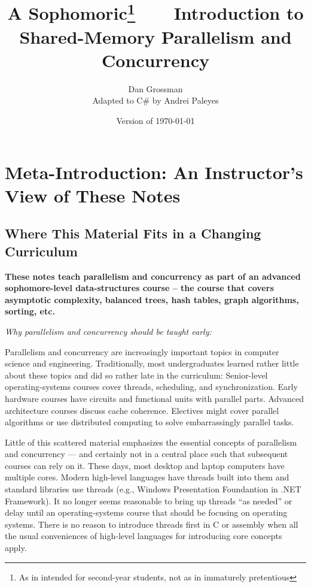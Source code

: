 \documentclass[10pt]{article}
\title{A Sophomoric\footnote{As in intended for second-year students,
    not as in immaturely pretentious}\ \ \ \ Introduction to\\ Shared-Memory
    Parallelism and Concurrency}
\author{Dan Grossman\\
Adapted to C\# by Andrei Paleyes}
\date{Version of \today}
\begin{document}
\maketitle

\newpage

\setcounter{tocdepth}{2}
\tableofcontents

\section{Meta-Introduction: An Instructor's View of These Notes}
\label{sec:meta-intro}

\subsection{Where This Material Fits in a Changing Curriculum}

\medskip
\noindent \textbf{These notes teach parallelism and concurrency as part of an
  advanced sophomore-level data-structures course -- the course that
  covers asymptotic complexity, balanced trees, hash tables, graph
  algorithms, sorting, etc.}
\medskip

\medskip
\noindent \emph{Why parallelism and concurrency should be taught early:}
\medskip

Parallelism and concurrency are increasingly important topics in
computer science and engineering.  Traditionally, most undergraduates
learned rather little about these topics and did so rather late in the
curriculum: Senior-level operating-systems courses cover threads,
scheduling, and synchronization.  Early hardware courses have circuits
and functional units with parallel parts.  Advanced architecture
courses discuss cache coherence.  Electives might cover parallel
algorithms or use distributed computing to solve embarrassingly
parallel tasks.

Little of this scattered material emphasizes the essential concepts of
parallelism and concurrency --- and certainly not in a central place
such that subsequent courses can rely on it.  These days, most desktop
and laptop computers have multiple cores.  Modern high-level languages
have threads built into them and standard libraries use threads (e.g.,
Windows Presentation Foundantion in .NET Framework).  It no longer seems reasonable to
bring up threads ``as needed'' or delay until an operating-systems
course that should be focusing on operating systems.  There is no
reason to introduce threads first in C or assembly when all the usual
conveniences of high-level languages for introducing core concepts
apply.
\end{document}
